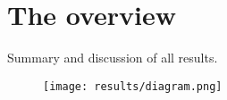 \chapter{The overview}
\label{sec:overview}

Summary and discussion of all results. 

\begin{figure}
\centering
\texttt{[image: results/diagram.png]}
\end{figure}